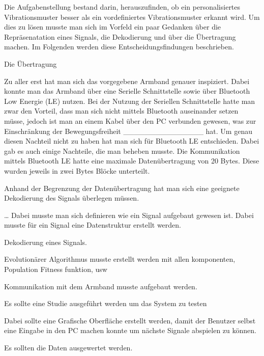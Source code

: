 
Die Aufgabenstellung bestand darin, herauszufinden, ob ein personalisiertes Vibrationsmuster besser als ein vordefiniertes Vibrationsmuster erkannt wird.
Um dies zu lösen musste man sich im Vorfeld ein paar Gedanken über die Repräsenatation eines Signals, die Dekodierung und über die Übertragung machen.
Im Folgenden werden diese Entscheidungsfindungen beschrieben.

Die Übertragung

Zu aller erst hat man sich das vorgegebene Armband genauer inspiziert. Dabei konnte man das Armband über eine Serielle Schnittstelle sowie über Bluetooth Low Energie (LE) nutzen. 
Bei der Nutzung der Seriellen Schnittstelle hatte man zwar den Vorteil, dass man sich nicht mittels Bluetooth auseinander setzen müsse, jedoch ist man an einem Kabel über den PC verbunden gewesen, was zur Einschränkung der Bewegungsfreiheit _______________ hat. Um genau diesen Nachteil nicht zu haben hat man sich für Bluetooth LE entschieden. Dabei gab es auch einige Nachteile, die man beheben musste. Die Kommunikation mittels Bluetooth LE hatte eine maximale Datenübertragung von 20 Bytes. Diese wurden jeweils in zwei Bytes Blöcke unterteilt.

Anhand der Begrenzung der Datenübertragung hat man sich eine geeignete Dekodierung des Signals überlegen müssen. 











\dots
Dabei musste man sich definieren wie ein Signal aufgebaut gewesen ist. Dabei musste für ein Signal eine Datenstruktur erstellt werden. 



Dekodierung eines Signals.

Evolutionärer Algorithmus musste erstellt werden mit allen komponenten, Population Fitness funktion, usw

Kommunikation mit dem Armband musste aufgebaut werden. 

Es sollte eine Studie ausgeführt werden um das System zu testen 

Dabei sollte eine Grafische Oberfläche erstellt werden, damit der Benutzer selbst eine Eingabe in den PC machen konnte um nächste Signale abspielen zu können.

Es sollten die Daten ausgewertet werden.
